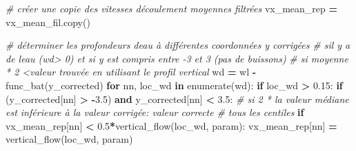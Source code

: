 \documentclass[
]{article}
\newenvironment{Shaded}{\begin{snugshade}}{\end{snugshade}}
\newcommand{\BuiltInTok}[1]{#1}
\newcommand{\CommentTok}[1]{\textcolor[rgb]{0.56,0.35,0.01}{\textit{#1}}}
\newcommand{\ControlFlowTok}[1]{\textcolor[rgb]{0.13,0.29,0.53}{\textbf{#1}}}
\newcommand{\FloatTok}[1]{\textcolor[rgb]{0.00,0.00,0.81}{#1}}
\newcommand{\KeywordTok}[1]{\textcolor[rgb]{0.13,0.29,0.53}{\textbf{#1}}}
\newcommand{\NormalTok}[1]{#1}
\newcommand{\OperatorTok}[1]{\textcolor[rgb]{0.81,0.36,0.00}{\textbf{#1}}}
\begin{document}
\begin{Shaded}
\begin{Highlighting}[]
\CommentTok{\# créer une copie des vitesses d\textquotesingle{}écoulement moyennes filtrées}
\NormalTok{vx\_mean\_rep }\OperatorTok{=}\NormalTok{ vx\_mean\_fil.copy()}

\CommentTok{\# déterminer les profondeurs d\textquotesingle{}eau à différentes coordonnées y corrigées}
\CommentTok{\# s\textquotesingle{}il y a de l\textquotesingle{}eau (wd\textgreater{} 0) et si y est compris entre {-}3 et 3 (pas de buissons)}
\CommentTok{\# si moyenne * 2 \textless{}valeur trouvée en utilisant le profil vertical}
\NormalTok{wd }\OperatorTok{=}\NormalTok{ wl }\OperatorTok{{-}}\NormalTok{ func\_bat(y\_corrected)}
\ControlFlowTok{for}\NormalTok{ nn, loc\_wd }\KeywordTok{in} \BuiltInTok{enumerate}\NormalTok{(wd):}
    \ControlFlowTok{if}\NormalTok{ loc\_wd }\OperatorTok{\textgreater{}} \FloatTok{0.15}\NormalTok{:}
        \ControlFlowTok{if}\NormalTok{ (y\_corrected[nn] }\OperatorTok{\textgreater{}} \OperatorTok{{-}}\FloatTok{3.5}\NormalTok{) }\KeywordTok{and}\NormalTok{ y\_corrected[nn] }\OperatorTok{\textless{}} \FloatTok{3.5}\NormalTok{:}
            \CommentTok{\# si 2 * la valeur médiane est inférieure à la valeur corrigée: valeur correcte}
            \CommentTok{\# tous les centiles}
            \ControlFlowTok{if}\NormalTok{ vx\_mean\_rep[nn] }\OperatorTok{\textless{}} \FloatTok{0.5}\OperatorTok{*}\NormalTok{vertical\_flow(loc\_wd, param):}
\NormalTok{                    vx\_mean\_rep[nn] }\OperatorTok{=}\NormalTok{ vertical\_flow(loc\_wd, param)}
\end{Highlighting}
\end{Shaded}
\end{document}
